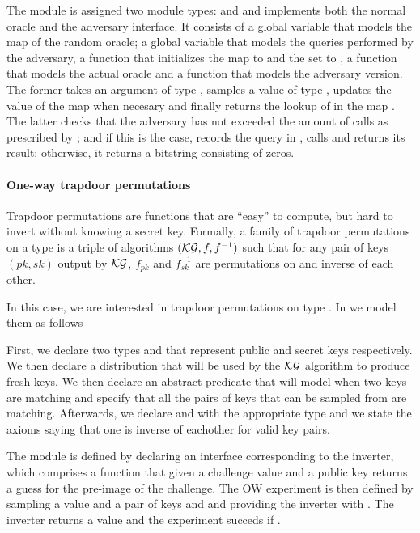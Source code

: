 

The module  is assigned two module types:  and
 and implements both the normal oracle and the adversary
interface. It consists of a global variable  that models the map
of the random oracle; a global variable  that models the queries
performed by the adversary, a function  that initializes the
map to  and the set to , a function  that
models the actual oracle and a function that models the adversary
version. The former takes an argument  of type ,
samples a value  of type , updates the value of
the map when necesary and finally returns the lookup of 
in the map . The latter checks that the adversary has not
exceeded the amount of calls as prescribed by ; and if this is
the case, records the query in , calls  and returns its
result; otherwise, it returns a bitstring consisting of zeros.


\paragraph{One-way trapdoor permutations}
Trapdoor permutations are functions that are ``easy'' to compute, but
hard to invert without knowing a secret key. Formally, a family
of trapdoor permutations on a type  is a triple of algorithms
$(\mathcal{KG},f,f^{-1})$ such that for any pair of keys $(pk,sk)$ output by
$\mathcal{KG}$, $f_{pk}$ and $f^{-1}_{sk}$ are permutations on
 and inverse of each other. 

In this case, we are interested in trapdoor permutations on type
. In \EasyCrypt we model them as follows


First, we declare two types  and  that represent
public and secret keys respectively. We then declare a distribution
 that will be used by the $\mathcal{KG}$ algorithm to produce fresh
keys. We then declare an abstract predicate that will model when two
keys are matching and specify that all the pairs of keys that can be
sampled from  are matching. Afterwards, we declare 
and  with the appropriate type and we state the axioms saying
that one is inverse of eachother for valid key pairs.
 
The module  is defined by declaring an interface corresponding
to the inverter, which comprises a function that given a challenge
value and a public key returns a guess for the pre-image of the
challenge. The OW experiment is then defined by sampling a value
 and a pair of keys  and  and providing the
inverter with . The inverter returns a value  and
the experiment succeds if .

